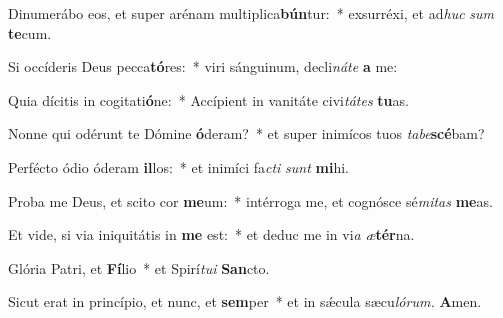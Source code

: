 \item Dinumerábo eos, et super arénam multiplica\textbf{bún}tur:~* exsurréxi, et ad\textit{huc} \textit{sum} \textbf{te}cum.
\item Si occíderis Deus pecca\textbf{tó}res:~* viri sánguinum, decli\textit{náte} \textbf{a} me:
\item Quia dícitis in cogitati\textbf{ó}ne:~* Accípient in vanitáte civi\textit{tátes} \textbf{tu}as.
\item Nonne qui odérunt te Dómine \textbf{ó}deram?~* et super inimícos tuos \textit{tabe}\textbf{scé}bam?
\item Perfécto ódio óderam \textbf{il}los:~* et inimíci fa\hspace*{0.02em}\textit{cti} \textit{sunt} \textbf{mi}hi.
\item Proba me Deus, et scito cor \textbf{me}um:~* intérroga me, et cognósce sé\textit{mitas} \textbf{me}as.
\item Et vide, si via iniquitátis in \textbf{me} est:~* et deduc me in vi\hspace*{0.02em}\textit{a} \textit{æ}\textbf{tér}na.
\item Glória Patri, et \textbf{Fí}lio~* et Spirí\hspace*{0.03em}\textit{tui} \textbf{San}cto.
\item Sicut erat in princípio, et nunc, et \textbf{sem}per~* et in sǽcula sæcu\hspace*{0.03em}\textit{lórum.} \textbf{A}men.

